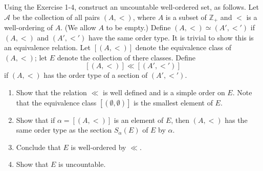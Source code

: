 \documentclass[a4paper,12pt]{article}
\begin{document}
\begin{exe}
	Using the Exercise 1-4, construct an uncountable well-ordered set, as follows.
	Let \( \mathcal{A} \) be the collection of all pairs \( (A,<) \),
	where \( A \) is a subset of \( \mathbb{Z}_{+} \) and \( < \) is a well-ordering of \( A \).
	(We allow \( A \) to be empty.)
	Define \( (A,<) \simeq (A',<') \)
	if \( (A,<) \) and \( (A',<') \) have the same order type.
	It is trivial to show this is an equivalence relation.
	Let \( \left[ (A,<) \right] \) denote the equivalence class of \( (A,<) \);
	let \( E \) denote the collection of there classes.
	Define
	\begin{equation}\label{secsupE8order}
		\left[ (A,<) \right] \ll \left[ (A',<') \right]
	\end{equation}
	if \( (A,<) \) has the order type of a section of \( (A',<') \).
	\begin{enumerate}
		\item
		      Show that the relation \( \ll \) is well defined and is a simple order on \( E \).
		      Note that the equivalence class \( \left[ (\emptyset,\emptyset) \right] \)
		      is the smallest element of \( E \).
		      
		\item
		      Show that if \( \alpha = \left[ (A,<) \right] \) is an element of \( E \),
		      then \( (A,<) \) has the same order type as the section \( S_{\alpha}(E) \)
		      of \( E \) by \( \alpha \).
		      
		\item
		      Conclude that \( E \) is well-ordered by \( \ll \).
		      
		\item
		      Show that \( E \) is uncountable.
	\end{enumerate}
\end{exe}
\end{document}
